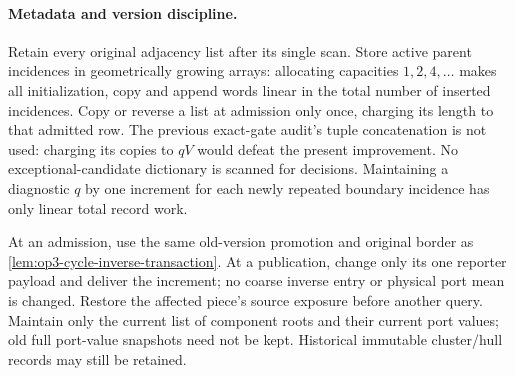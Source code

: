 \paragraph{Metadata and version discipline.}
Retain every original adjacency list after its single scan. Store active
parent incidences in geometrically growing arrays: allocating capacities
$1,2,4,\ldots$ makes all initialization, copy and append words linear in
the total number of inserted incidences. Copy or reverse a list at admission
only once, charging its length to that admitted row. The previous exact-gate
audit's tuple concatenation is not used: charging its copies to $qV$ would
defeat the present improvement. No exceptional-candidate dictionary is
scanned for decisions. Maintaining a diagnostic $q$ by one increment for
each newly repeated boundary incidence has only linear total record work.

At an admission, use the same old-version promotion and original border
as \cref{lem:op3-cycle-inverse-transaction}. At a publication, change only
its one reporter payload and deliver the increment; no coarse inverse
entry or physical port mean is changed. Restore the affected piece's source
exposure before another query. Maintain only the current list of component
roots and their current port values; old full port-value snapshots need
not be kept. Historical immutable cluster/hull records may still be retained.


